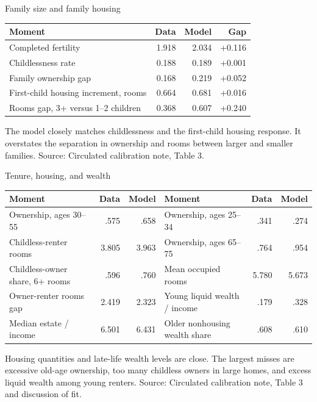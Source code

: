 \documentclass[aspectratio=169,11pt]{beamer}
\newcommand{\source}[1]{\vfill{\color{Muted}\tiny Source: #1}}
\begin{document}
\begin{frame}{Family size and family housing}
  \small
  \centering
  \begin{tabularx}{\textwidth}{Yrrr}
    \toprule
    Moment & Data & Model & Gap\\
    \midrule
    Completed fertility & 1.918 & 2.034 & +0.116\\
    Childlessness rate & 0.188 & 0.189 & +0.001\\
    Family ownership gap & 0.168 & 0.219 & +0.052\\
    First-child housing increment, rooms & 0.664 & 0.681 & +0.016\\
    Rooms gap, 3+ versus 1--2 children & 0.368 & 0.607 & +0.240\\
    \bottomrule
  \end{tabularx}

  \vspace{1.0em}
  The model closely matches childlessness and the first-child housing response. It overstates the separation in ownership and rooms between larger and smaller families.
  \source{Circulated calibration note, Table 3.}
\end{frame}

\begin{frame}{Tenure, housing, and wealth}
  \scriptsize
  \centering
  \begin{tabularx}{\textwidth}{Yrr@{\hspace{1.5em}}Yrr}
    \toprule
    Moment & Data & Model & Moment & Data & Model\\
    \midrule
    Ownership, ages 30--55 & .575 & .658 & Ownership, ages 25--34 & .341 & .274\\
    Childless-renter rooms & 3.805 & 3.963 & Ownership, ages 65--75 & .764 & .954\\
    Childless-owner share, 6+ rooms & .596 & .760 & Mean occupied rooms & 5.780 & 5.673\\
    Owner-renter rooms gap & 2.419 & 2.323 & Young liquid wealth / income & .179 & .328\\
    Median estate / income & 6.501 & 6.431 & Older nonhousing wealth share & .608 & .610\\
    \bottomrule
  \end{tabularx}

  \vspace{0.9em}
  \normalsize
  Housing quantities and late-life wealth levels are close. The largest misses are excessive old-age ownership, too many childless owners in large homes, and excess liquid wealth among young renters.
  \source{Circulated calibration note, Table 3 and discussion of fit.}
\end{frame}
\end{document}
